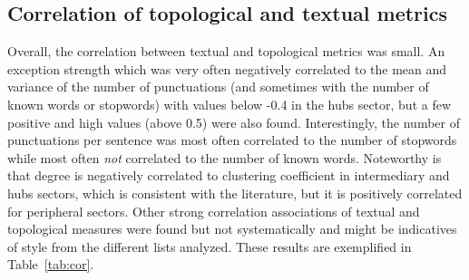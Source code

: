 
%
%
%
%
%
%
%
%
%
%
%
%
%





\subsection{Correlation of topological and textual metrics}\label{subsec:cor}

Overall, the correlation between textual and topological metrics was small. 
An exception strength which was very often negatively correlated to the mean and variance of the number
of punctuations (and sometimes with the number of known words or stopwords) with values below -0.4 in the hubs sector, but a few positive and high values (above 0.5) were also found.
Interestingly, the number of punctuations per sentence was most often correlated to the number of stopwords
while most often \emph{not} correlated to the number of known words.
Noteworthy is that degree is negatively correlated to clustering coefficient in intermediary and hubs sectors,
which is consistent with the literature, but it is positively correlated for
peripheral sectors.
Other strong correlation associations of textual and topological measures were found
but not systematically and might be indicatives of style from the different lists analyzed.
These results are exemplified in Table~\ref{tab:cor}.

\FloatBarrier
